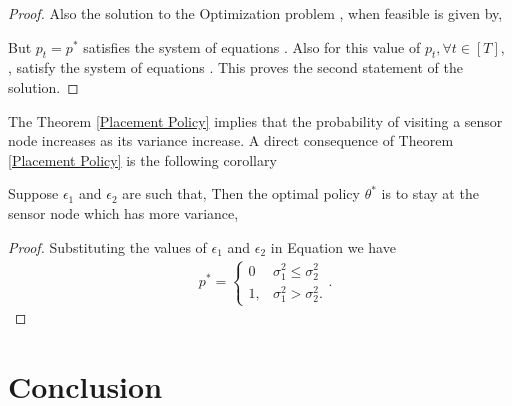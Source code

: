 \documentclass[a4paper,english,12pt]{article}
\begin{document}
\begin{proof}
  Also the solution to the Optimization problem , when feasible is given by,
    
  But $p_t=p^*$ satisfies the system of equations . Also for this value of $p_t, \forall t \in [T]$,  , satisfy the system of equations . 
    This proves the second statement of the solution.
  
  
  \end{proof}


The Theorem \ref{Placement  Policy} implies that the probability of visiting a sensor node increases as its variance increase. A direct consequence of Theorem \ref{Placement Policy} is the following corollary

\begin{cor}
Suppose $\epsilon_1$ and $\epsilon_2$ are such that, 
Then the optimal policy $\theta^*$ is to stay at the sensor node which has more variance,


\end{cor}
\begin{proof}
Substituting the values of $\epsilon_1$ and $\epsilon_2$ in Equation  we have \begin{align}
    & p^* =\begin{cases}
      0 & \sigma_1^2 \leq \sigma_2^2\\
     1, &  \sigma_1^2 > \sigma_2^2.
    \end{cases}.
    \end{align}
    

\end{proof}




\section{Conclusion}
\end{document}
